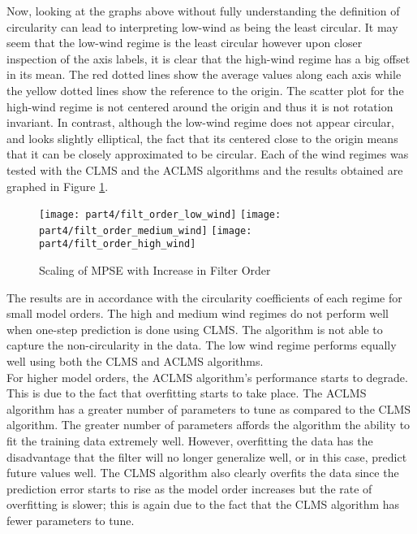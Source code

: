 \noindent{}Now, looking at the graphs above without fully understanding the definition of circularity can lead to interpreting low-wind as being the least circular. It may seem that the low-wind regime is the least circular however upon closer inspection of the axis labels, it is clear that the high-wind regime has a big offset in its mean. The red dotted lines show the average values along each axis while the yellow dotted lines show the reference to the origin. The scatter plot for the high-wind regime is not centered around the origin and thus it is not rotation invariant. In contrast, although the low-wind regime does not appear circular, and looks slightly elliptical, the fact that its centered close to the origin means that it can be closely approximated to be circular. Each of the wind regimes was tested with the CLMS and the ACLMS algorithms and the results obtained are graphed in Figure \ref{fig:wind_order}.

\begin{figure}[H]
\centering{}
\texttt{[image: part4/filt\_order\_low\_wind]}
\texttt{[image: part4/filt\_order\_medium\_wind]}
\texttt{[image: part4/filt\_order\_high\_wind]}
\caption{Scaling of MPSE with Increase in Filter Order}
\label{fig:wind_order}
\end{figure}

\noindent{}The results are in accordance with the circularity coefficients of each regime for small model orders. The high and medium wind regimes do not perform well when one-step prediction is done using CLMS. The algorithm is not able to capture the non-circularity in the data. The low wind regime performs equally well using both the CLMS and ACLMS algorithms.\\

\noindent{}For higher model orders, the ACLMS algorithm's performance starts to degrade. This is due to the fact that overfitting starts to take place. The ACLMS algorithm has a greater number of parameters to tune as compared to the CLMS algorithm. The greater number of parameters affords the algorithm the ability to fit the training data extremely well. However, overfitting the data has the disadvantage that the filter will no longer generalize well, or in this case, predict future values well. The CLMS algorithm also clearly overfits the data since the prediction error starts to rise as the model order increases but the rate of overfitting is slower; this is again due to the fact that the CLMS algorithm has fewer parameters to tune. \\

